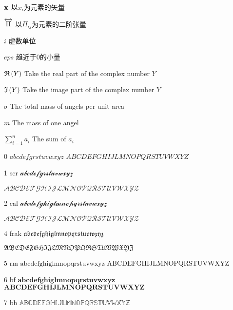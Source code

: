 
\begin{notation}

  \begin{notationlist}{2em}
    \item[$\displaystyle \mathbf{x}$] 以$x_i$为元素的矢量 
    \item[$\displaystyle \overleftrightarrow{\Pi}$] 以$\Pi_{ij}$为元素的二阶张量
    \item[$\displaystyle i$] 虚数单位
    \item[$\displaystyle eps$] 趋近于0的小量
    \item[$\displaystyle \mathfrak{R} \left(Y \right)$] Take the real part of the complex number $Y$
    \item[$\displaystyle \mathfrak{I} \left(Y \right)$] Take the image part of the complex number $Y$
    \item[$\displaystyle \sigma$] The total mass of angels per unit area
    \item[$\displaystyle m$] The mass of one angel
    \item[$\displaystyle \sum_{i=1}^n a_i$] The sum of $a_i$
  \end{notationlist}

\end{notation}


0 
${abcdefgrstuvwxyz}$
${ABCDEFGHIJLMNOPQRSTUVWXYZ}$


1 scr
$\mathscr{abcdefgrstuvwxyz}$

$\mathscr{ABCDEFGHIJLMNOPQRSTUVWXYZ}$

2 cal
$\mathcal{abcdefghiglmnopqrstuvwxyz}$

$\mathcal{ABCDEFGHIJLMNOPQRSTUVWXYZ}$


4 frak
$\mathfrak{abcdefghiglmnopqrstuvwxyz}$

$\mathfrak{ABCDEFGHIJLMNOPQRSTUVWXYZ}$

5 rm
$\mathrm{abcdefghiglmnopqrstuvwxyz}$
$\mathrm{ABCDEFGHIJLMNOPQRSTUVWXYZ}$

6 bf
$\mathbf{abcdefghiglmnopqrstuvwxyz}$
$\mathbf{ABCDEFGHIJLMNOPQRSTUVWXYZ}$

7 bb
$\mathbb{ABCDEFGHIJLMNOPQRSTUVWXYZ}$




